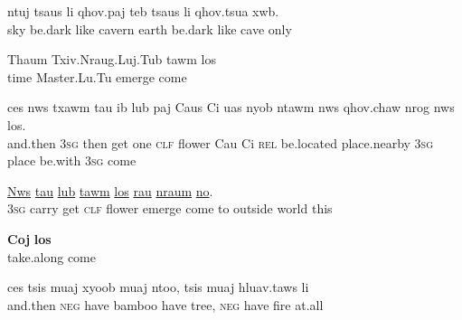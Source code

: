 \documentclass[output=paper]{LSP/langsci}
\begin{document}
\begin{exe}
\ex \label{JaexApp17}
\gll ntuj tsaus li qhov.paj teb tsaus li qhov.tsua xwb.\\
     sky be.dark like cavern earth be.dark like cave only\\
\glt {}
\end{exe}

\begin{exe}
\ex \label{JaexApp18}
\gll Thaum Txiv.Nraug.Luj.Tub tawm los\\
     time Master.Lu.Tu emerge come\\
\glt {}
\end{exe}

\begin{exe}
\ex \label{JaexApp19}
\gll ces nws txawm tau ib lub paj Caus Ci uas nyob ntawm nws qhov.chaw nrog nws los.\\
     and.then \textsc{3sg} then get one \textsc{clf} flower Cau Ci \textsc{rel} be.located place.nearby \textsc{3sg} place be.with \textsc{3sg} come\\
\glt {}
\end{exe}

\begin{exe}
\ex \label{JaexApp20}
\gll \underline{Nws} \underline{} \underline{tau} \underline{lub} \underline{} \underline{tawm} \underline{los} \underline{rau} \underline{nraum} \underline{} \underline{no}.\\
     \textsc{3sg} carry get \textsc{clf} flower emerge come to outside world this\\
\glt {}
\end{exe}

\begin{exe}
\ex \label{JaexApp21}
\gll \textbf{Coj} \textbf{los}\\
     take.along come\\
\glt {}
\end{exe}

\begin{exe}
\ex \label{JaexApp22}
\gll ces tsis muaj xyoob muaj ntoo, tsis muaj hluav.taws li\\
     and.then \textsc{neg} have bamboo have tree, \textsc{neg} have fire at.all\\
\glt  {}
\end{exe}
\end{document}
